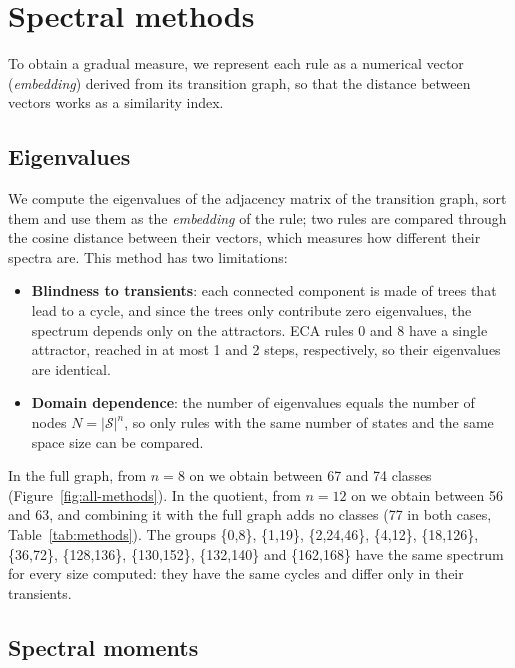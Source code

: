 \section{Spectral methods}
\label{sec:spectral}

To obtain a gradual measure, we represent each rule as a numerical vector (\emph{embedding}) derived from its transition graph, so that the distance between vectors works as a similarity index.

\subsection{Eigenvalues}

We compute the eigenvalues of the adjacency matrix of the transition graph, sort them and use them as the \emph{embedding} of the rule; two rules are compared through the cosine distance between their vectors, which measures how different their spectra are. This method has two limitations:
\begin{itemize}
    \item \textbf{Blindness to transients}: each connected component is made of trees that lead to a cycle, and since the trees only contribute zero eigenvalues, the spectrum depends only on the attractors. ECA rules 0 and 8 have a single attractor, reached in at most 1 and 2 steps, respectively, so their eigenvalues are identical.
    \item \textbf{Domain dependence}: the number of eigenvalues equals the number of nodes $N = |\mathcal{S}|^n$, so only rules with the same number of states and the same space size can be compared.
\end{itemize}

In the full graph, from $n = 8$ on we obtain between 67 and 74 classes (Figure~\ref{fig:all-methods}). In the quotient, from $n = 12$ on we obtain between 56 and 63, and combining it with the full graph adds no classes (77 in both cases, Table~\ref{tab:methods}). The groups \{0,8\}, \{1,19\}, \{2,24,46\}, \{4,12\}, \{18,126\}, \{36,72\}, \{128,136\}, \{130,152\}, \{132,140\} and \{162,168\} have the same spectrum for every size computed: they have the same cycles and differ only in their transients.

\subsection{Spectral moments}

